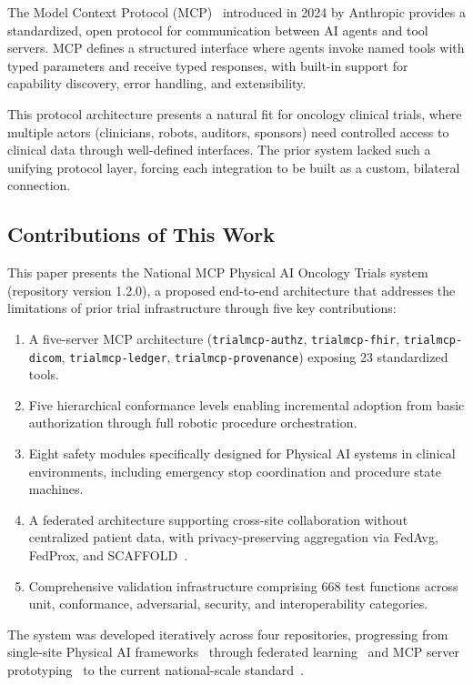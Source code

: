\documentclass{article}
\begin{document}
The Model Context Protocol (MCP)~\cite{mcp2024protocol} introduced in 2024 by Anthropic provides a standardized, open protocol for communication between AI agents and tool servers. MCP defines a structured interface where agents invoke named tools with typed parameters and receive typed responses, with built-in support for capability discovery, error handling, and extensibility.

This protocol architecture presents a natural fit for oncology clinical trials, where multiple actors (clinicians, robots, auditors, sponsors) need controlled access to clinical data through well-defined interfaces. The prior system lacked such a unifying protocol layer, forcing each integration to be built as a custom, bilateral connection.

\subsection{Contributions of This Work}

This paper presents the National MCP Physical AI Oncology Trials system (repository version 1.2.0), a proposed end-to-end architecture that addresses the limitations of prior trial infrastructure through five key contributions:

\begin{enumerate}[leftmargin=*]
\item A five-server MCP architecture (\texttt{trialmcp-authz}, \texttt{trialmcp-fhir}, \texttt{trialmcp-dicom}, \texttt{trialmcp-ledger}, \texttt{trialmcp-provenance}) exposing 23 standardized tools.
\item Five hierarchical conformance levels enabling incremental adoption from basic authorization through full robotic procedure orchestration.
\item Eight safety modules specifically designed for Physical AI systems in clinical environments, including emergency stop coordination and procedure state machines.
\item A federated architecture supporting cross-site collaboration without centralized patient data, with privacy-preserving aggregation via FedAvg, FedProx, and SCAFFOLD~\cite{mcmahan2017fedavg,kairouz2021federated}.
\item Comprehensive validation infrastructure comprising 668 test functions across unit, conformance, adversarial, security, and interoperability categories.
\end{enumerate}

The system was developed iteratively across four repositories, progressing from single-site Physical AI frameworks~\cite{kawchak2026physicalai} through federated learning~\cite{kawchak2026paifl} and MCP server prototyping~\cite{kawchak2026trialmcp} to the current national-scale standard~\cite{kawchak2026national}.
\end{document}
